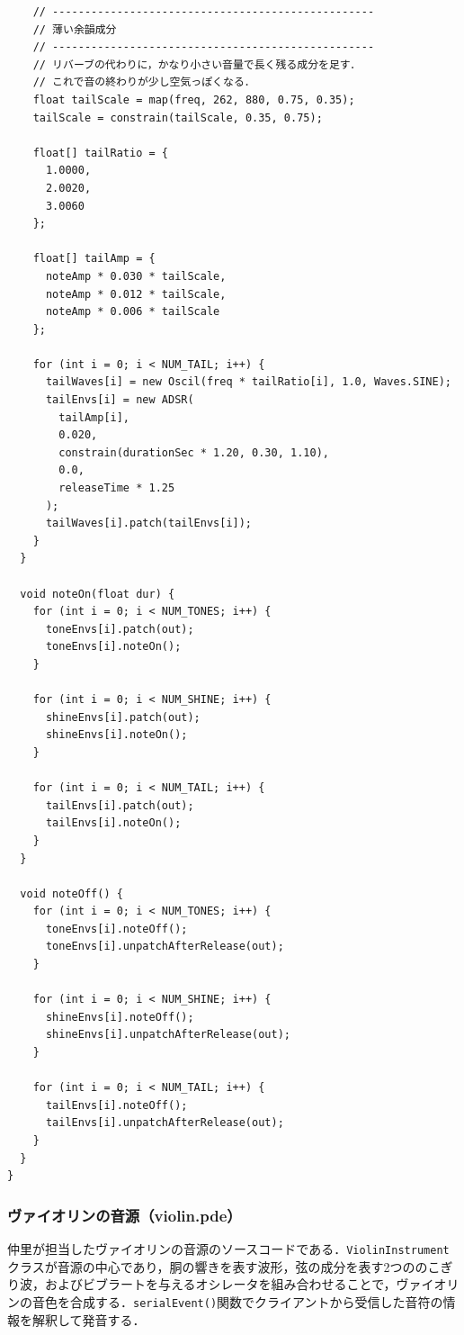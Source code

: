 \begin{lstlisting}
    // --------------------------------------------------
    // 薄い余韻成分
    // --------------------------------------------------
    // リバーブの代わりに，かなり小さい音量で長く残る成分を足す．
    // これで音の終わりが少し空気っぽくなる．
    float tailScale = map(freq, 262, 880, 0.75, 0.35);
    tailScale = constrain(tailScale, 0.35, 0.75);

    float[] tailRatio = {
      1.0000,
      2.0020,
      3.0060
    };

    float[] tailAmp = {
      noteAmp * 0.030 * tailScale,
      noteAmp * 0.012 * tailScale,
      noteAmp * 0.006 * tailScale
    };

    for (int i = 0; i < NUM_TAIL; i++) {
      tailWaves[i] = new Oscil(freq * tailRatio[i], 1.0, Waves.SINE);
      tailEnvs[i] = new ADSR(
        tailAmp[i],
        0.020,
        constrain(durationSec * 1.20, 0.30, 1.10),
        0.0,
        releaseTime * 1.25
      );
      tailWaves[i].patch(tailEnvs[i]);
    }
  }

  void noteOn(float dur) {
    for (int i = 0; i < NUM_TONES; i++) {
      toneEnvs[i].patch(out);
      toneEnvs[i].noteOn();
    }

    for (int i = 0; i < NUM_SHINE; i++) {
      shineEnvs[i].patch(out);
      shineEnvs[i].noteOn();
    }

    for (int i = 0; i < NUM_TAIL; i++) {
      tailEnvs[i].patch(out);
      tailEnvs[i].noteOn();
    }
  }

  void noteOff() {
    for (int i = 0; i < NUM_TONES; i++) {
      toneEnvs[i].noteOff();
      toneEnvs[i].unpatchAfterRelease(out);
    }

    for (int i = 0; i < NUM_SHINE; i++) {
      shineEnvs[i].noteOff();
      shineEnvs[i].unpatchAfterRelease(out);
    }

    for (int i = 0; i < NUM_TAIL; i++) {
      tailEnvs[i].noteOff();
      tailEnvs[i].unpatchAfterRelease(out);
    }
  }
}
\end{lstlisting}

\subsubsection{ヴァイオリンの音源（violin.pde）}
仲里が担当したヴァイオリンの音源のソースコードである．\texttt{ViolinInstrument}クラスが音源の中心であり，胴の響きを表す波形，弦の成分を表す2つののこぎり波，およびビブラートを与えるオシレータを組み合わせることで，ヴァイオリンの音色を合成する．\texttt{serialEvent()}関数でクライアントから受信した音符の情報を解釈して発音する．

